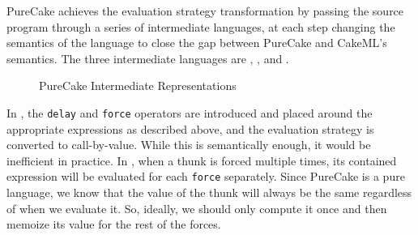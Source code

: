 PureCake achieves the evaluation strategy transformation by passing the source
program through a series of intermediate languages, at each step changing the
semantics of the language to close the gap between PureCake and CakeML's
semantics. The three intermediate languages are \ThunkLang{}, \EnvLang{}, and
\StateLang{}.

\begin{figure}[h]
  \caption{PureCake Intermediate Representations}
\end{figure}

In \ThunkLang{}, the \texttt{delay} and \texttt{force} operators are introduced
and placed around the appropriate expressions as described above, and the
evaluation strategy is converted to call-by-value. While this is semantically
enough, it would be inefficient in practice. In \ThunkLang{}, when a thunk is
forced multiple times, its contained expression will be evaluated for each
\texttt{force} separately. Since PureCake is a pure language, we know that the
value of the thunk will always be the same regardless of when we evaluate it.
So, ideally, we should only compute it once and then memoize its value for the
rest of the forces.

